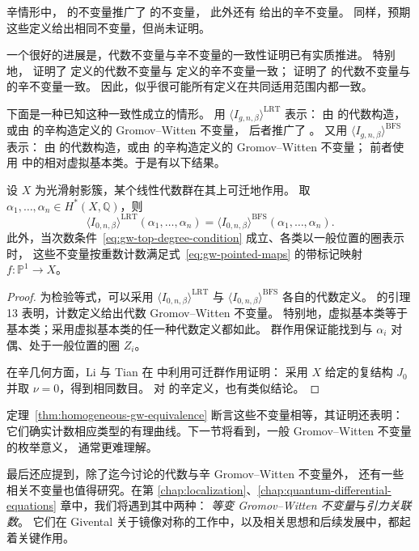 辛情形中， 的不变量推广了  的不变量，
此外还有  给出的辛不变量。
同样，预期这些定义给出相同不变量，但尚未证明。

一个很好的进展是，代数不变量与辛不变量的一致性证明已有实质推进。
特别地， 证明了  定义的代数不变量与
 定义的辛不变量一致；
 证明了  的代数不变量与
 的辛不变量一致。
因此，似乎很可能所有定义在共同适用范围内都一致。

下面是一种已知这种一致性成立的情形。
用 $\langle I_{g,n,\beta}\rangle^{\mathrm{LRT}}$ 表示：
由  的代数构造，或由  的辛构造定义的 Gromov--Witten 不变量，
后者推广了 。
又用 $\langle I_{g,n,\beta}\rangle^{\mathrm{BFS}}$ 表示：
由  的代数构造，或由  的辛构造定义的 Gromov--Witten 不变量；
前者使用  中的相对虚拟基本类。于是有以下结果。

\begin{theorem}\label{thm:homogeneous-gw-equivalence}
设 $X$ 为光滑射影簇，某个线性代数群在其上可迁地作用。
取 $\alpha_1,\ldots,\alpha_n\in H^*(X,\mathbb Q)$，则
\[
\langle I_{0,n,\beta}\rangle^{\mathrm{LRT}}(\alpha_1,\ldots,\alpha_n)
=\langle I_{0,n,\beta}\rangle^{\mathrm{BFS}}(\alpha_1,\ldots,\alpha_n).
\]
此外，当次数条件~\eqref{eq:gw-top-degree-condition} 成立、各类以一般位置的圈表示时，
这些不变量按重数计数满足式~\eqref{eq:gw-pointed-maps} 的带标记映射 $f:\mathbb P^1\to X$。
\end{theorem}
\begin{proof}
为检验等式，可以采用 $\langle I_{0,n,\beta}\rangle^{\mathrm{LRT}}$
与 $\langle I_{0,n,\beta}\rangle^{\mathrm{BFS}}$ 各自的代数定义。
 的引理 13 表明，计数定义给出代数 Gromov--Witten 不变量。
特别地，虚拟基本类等于基本类；采用虚拟基本类的任一种代数定义都如此。
群作用保证能找到与 $\alpha_i$ 对偶、处于一般位置的圈 $Z_i$。

在辛几何方面，Li 与 Tian 在  中利用可迁群作用证明：
采用 $X$ 给定的复结构 $J_0$ 并取 $\nu=0$，得到相同数目。
对  的辛定义，也有类似结论。
\end{proof}

定理~\ref{thm:homogeneous-gw-equivalence} 断言这些不变量相等，其证明还表明：
它们确实计数相应类型的有理曲线。下一节将看到，一般 Gromov--Witten 不变量的枚举意义，
通常更难理解。

最后还应提到，除了迄今讨论的代数与辛 Gromov--Witten 不变量外，
还有一些相关不变量也值得研究。在第 \hyperref[chap:localization]{\ref*{chap:localization}}、\hyperref[chap:quantum-differential-equations]{\ref*{chap:quantum-differential-equations}} 章中，我们将遇到其中两种：
\emph{等变 Gromov--Witten 不变量}与\emph{引力关联数}。
它们在 Givental 关于镜像对称的工作中，以及相关思想和后续发展中，都起着关键作用。

